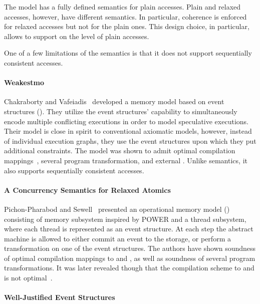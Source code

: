 The model has a fully defined semantics for plain accesses.  
Plain and relaxed accesses, however, have different semantics.
In particular, coherence is enforced for relaxed accesses 
but not for the plain ones. This design choice, in particular, 
allows to support \CSE on the level of plain accesses. 

One of a few limitations of the \Promising semantics is that 
it does not support sequentially consistent accesses. 

\paragraph{Weakestmo}

Chakraborty and Vafeiadis~\cite{Chakraborty-Vafeiadis:CGO17, Chakraborty-Vafeiadis:POPL19}
developed a memory model based on event structures (\WMO). 
They utilize the event structures' capability to simultaneously encode 
multiple conflicting executions in order to model speculative executions.
Their model is close in spirit to conventional axiomatic models, 
however, instead of individual execution graphs, they use 
the event structures upon which they put additional constraints. 
The model was shown to admit optimal compilation mappings~\cite{Moiseenko-al:ECOOP20},
several program transformation, and external \DRF.
Unlike \Promising semantics, it also supports 
sequentially consistent accesses.

\paragraph{A Concurrency Semantics for Relaxed Atomics}

Pichon-Pharabod and Sewell~\cite{PichonPharabod-Sewell:POPL16} 
presented an operational memory model (\CSRA) consisting of 
memory subsystem inspired by POWER and a thread subsystem, 
where each thread is represented as an event structure. 
At each step the abstract machine is allowed to either 
commit an event to the storage, or perform a transformation 
on one of the event structures. 
The authors have shown soundness of 
optimal compilation mappings to \Intel and \POWER, 
as well as soundness of several program transformations.
It was later revealed though that the compilation scheme
to  and  is not optimal~\cite{PichonPharabod:PhD18}.

\paragraph{Well-Justified Event Structures}

